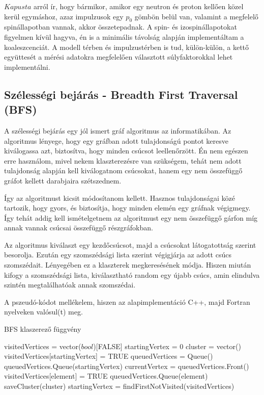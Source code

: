 \documentclass[a4paper,12pt]{article}
\begin{document}
\par $Kapusta$ arról ír, hogy bármikor, amikor egy neutron és proton kellően közel kerül egymáshoz, azaz impulzusok egy $p_{0}$ gömbön belül van, valamint a megfelelő spinállapotban vannak, akkor összetepadnak. A spin- és izospinállapotokat figyelmen kívül hagyva, én is a minimális távolság alapján implementáltam a koaleszcenciát. A modell térben és impulzustérben is tud, külön-külön, a kettő együttesét a mérési adatokra megfelelően választott súlyfaktorokkal lehet implementálni.

\subsection{ Szélességi bejárás - Breadth First Traversal (BFS)}

\par A szélességi bejárás egy jól ismert gráf algoritmus az informatikában. Az algoritmus lényege, hogy egy gráfban adott tulajdonságú pontot keresve kiválogassa azt, biztosítva, hogy minden csúcsot leellenőrzött. Én nem egészen erre használom, mivel nekem klaszterezésre van szükségem, tehát nem adott tulajdonság alapján kell kiválogatnom csúcsokat, hanem egy nem összefüggő gráfot kellett darabjaira szétszednem.
\par Így az algoritmust kicsit módosítanom kellett. Hasznos tulajdonságai közé tartozik, hogy gyors, és biztosítja, hogy minden elemén egy gráfnak végigmegy. Így tehát addig kell ismételgetnem az algoritmust egy nem összefüggő gárfon míg annak vannak csúcsai összefüggő részgráfokban. 
\par Az algoritmus kiválaszt egy kezdőcsúcsot, majd a csúcsokat látogatottság szerint besorolja. Ezután egy szomszédsági lista szerint végigjárja az adott csúcs szomszédait. Lényegében ez a klaszterek megkeresésének módja. Hiszen miután kifogy a szomszédsági lista, kiválasztható random egy újabb csúcs, amin elindulva szintén megtalálhatóak annak szomszédai. 
\par A pszeudó-kódot mellékelem, hiszen az alapimplementáció C++, majd Fortran nyelveken valósul(t) meg.

\begin{center}
\begin{algorithm}
\caption{BFS klaszerező függvény}
\begin{algorithmic}
\STATE visitedVertices = vector($bool$)[FALSE]
\STATE startingVertex = 0
	\STATE cluster = vector()
	\STATE visitedVertices[startingVertex] = TRUE
	\STATE queuedVertices = Queue()
	\STATE queuedVertices.Queue(startingVertex)
		\STATE currentVertex = queuedVertices.Front()
				\STATE visitedVertices[element] = TRUE
				\STATE queuedVertices.Queue(element)
			\ENDIF
		\ENDFOR
	\STATE saveCluster(cluster)
	\STATE startingVertex = findFirstNotVisited(visitedVertices)
	\ENDWHILE
\ENDWHILE
\end{algorithmic}
\end{algorithm}
\end{center}
\end{document}
